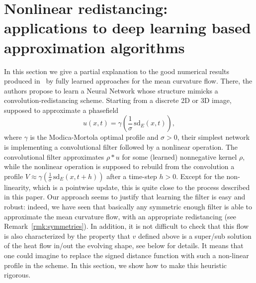 \documentclass[10pt]{amsart}
\theoremstyle{plain}
\theoremstyle{definition}
\newcommand{\g}{\gamma}
\newcommand{\sd}{\,\mathrm{sd}}
\numberwithin{equation}{section}
\begin{document}
 

\section{Nonlinear redistancing: applications to  deep learning based approximation algorithms }\label{sec:nonlinear}

In this section we give
a partial explanation to the good numerical results produced in~\cite{DeepLearningMCF}
by fully learned approaches for the mean
curvature flow.
There, the authors propose to learn a Neural Network
whose structure mimicks a convolution-redistancing scheme.
Starting from a discrete 2D or 3D image,
supposed
to approximate a phasefield 
\[
u(x,t)= \gamma\left(\frac{1}{\sigma}\sd_E(x,t)\right),
\]
where $\g$ is the Modica-Mortola optimal profile and $\sigma>0$, their simplest network is implementing a convolutional filter followed by a nonlinear operation.
The convolutional filter 
approximates $\rho*u$ for some (learned) nonnegative kernel $\rho$, while the  nonlinear operation   is supposed to rebuild
from the convolution a profile $V\approx\gamma(\frac{1}{\sigma}\sd_E(x,t+h))$
after a time-step $h>0$.
Except for the non-linearity, which
is a pointwise update, this is quite close to the
process described in this paper.
Our approach seems to justify that learning the filter
is easy and robust: indeed, we have seen that basically
any symmetric enough filter is able to approximate the
mean curvature flow, with an appropriate redistancing (see Remark~\ref{rmk:symmetries}).
In addition, it is not difficult to check that this
flow is also characterized by the property that
$v$ defined above is a super/sub solution of
the heat flow in/out the evolving shape, see below for details. It means that one
could imagine to replace the signed distance function with such a non-linear profile in the scheme. 
In this section, we show how to make this heuristic rigorous.
\end{document}
